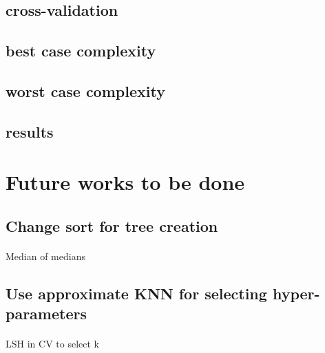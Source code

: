 \documentclass[11 pt]{article}
\begin{document}
\subsection{cross-validation}
\subsection{best case complexity}
\subsection{worst case complexity}
\subsection{results}




\section{Future works to be done}
\subsection{Change sort for tree creation}
\paragraph{}Median of medians

\subsection{Use approximate KNN for selecting hyper-parameters}
\paragraph{}LSH in CV to select k
\end{document}
